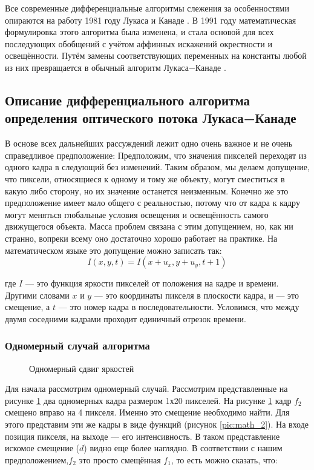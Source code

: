 Все современные дифференциальные алгоритмы слежения за особенностями опираются на работу 1981 году Лукаса и Канаде \cite{lyka_kan}. В 1991 году математическая формулировка этого алгоритма была изменена, и стала основой для всех последующих обобщений с учётом аффинных искажений окрестности и освещённости. Путём замены соответствующих переменных на константы любой из них превращается в обычный алгоритм Лукаса−Канаде \cite{lk_jou}.
\subsection{Описание дифференциального алгоритма определения оптического потока Лукаса−Канаде}

В основе всех дальнейших рассуждений лежит одно очень важное и не очень справедливое предположение: Предположим, что значения пикселей переходят из одного кадра в следующий без изменений. Таким образом, мы делаем допущение, что пиксели, относящиеся к одному и тому же объекту, могут сместиться в какую либо сторону, но их значение останется неизменным. Конечно же это предположение имеет мало общего с реальностью, потому что от кадра к кадру могут меняться глобальные условия освещения и освещённость самого движущегося объекта. Масса проблем связана с этим допущением, но, как ни странно, вопреки всему оно достаточно хорошо работает на практике. На математическом языке это допущение можно записать так:
\label{eq:f_0}
\begin{equation}
I(x,y,t)=I(x+u_x,y+u_y,t+1)
\end{equation}

где $I$ — это функция яркости пикселей от положения на кадре и времени. Другими словами $x$ и $y$ — это координаты пикселя в плоскости кадра, и — это смещение, а $t$ — это номер кадра в последовательности. Условимся, что между двумя соседними кадрами проходит единичный отрезок времени.
\subsubsection{Одномерный случай алгоритма}

\begin{figure}[ht]
\caption{Одномерный сдвиг яркостей}
\label{pic:math_1}
\end{figure}

Для начала рассмотрим одномерный случай. Рассмотрим представленные на рисунке \ref{pic:math_1} два одномерных кадра размером 1х20 пикселей. На  рисунке \ref{pic:math_1} кадр $f_2$ смещено вправо на 4 пикселя. Именно это смещение необходимо найти. Для этого представим эти же кадры в виде функций (рисунок \ref{pic:math_2}). На входе позиция пикселя, на выходе — его интенсивность. В таком представление искомое смещение ($d$) видно еще более наглядно. В соответствии с нашим предположением,$f_2$ это просто смещённая $f_1$, то есть можно сказать, что:

